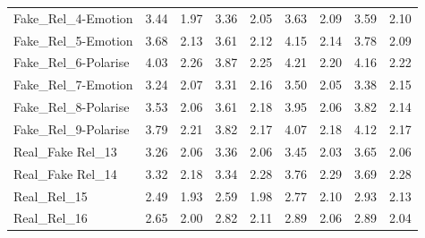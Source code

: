 \documentclass[empirical, authordate, issue]{jote-new-article}
\begin{document}
\begin{table}
\begin{tabularx}{\linewidth}{@{} X  S  S  S  S | S  S  S  S@{}}
    Fake\_Rel\_4-Emotion   & 3.44                                           & 1.97                                         & 3.36           & 2.05            & 3.63          & 2.09           & 3.59           & 2.10            \\
    Fake\_Rel\_5-Emotion   & 3.68                                           & 2.13                                         & 3.61           & 2.12            & 4.15          & 2.14           & 3.78           & 2.09            \\
    Fake\_Rel\_6-Polarise  & 4.03                                           & 2.26                                         & 3.87           & 2.25            & 4.21          & 2.20           & 4.16           & 2.22            \\
    Fake\_Rel\_7-Emotion   & 3.24                                           & 2.07                                         & 3.31           & 2.16            & 3.50          & 2.05           & 3.38           & 2.15            \\
    Fake\_Rel\_8-Polarise  & 3.53                                           & 2.06                                         & 3.61           & 2.18            & 3.95          & 2.06           & 3.82           & 2.14            \\
    Fake\_Rel\_9-Polarise  & 3.79                                           & 2.21                                         & 3.82           & 2.17            & 4.07          & 2.18           & 4.12           & 2.17            \\
    Real\_Fake Rel\_13     & 3.26                                           & 2.06                                         & 3.36           & 2.06            & 3.45          & 2.03           & 3.65           & 2.06            \\
    Real\_Fake Rel\_14     & 3.32                                           & 2.18                                         & 3.34           & 2.28            & 3.76          & 2.29           & 3.69           & 2.28            \\
    Real\_Rel\_15          & 2.49                                           & 1.93                                         & 2.59           & 1.98            & 2.77          & 2.10           & 2.93           & 2.13            \\
    Real\_Rel\_16          & 2.65                                           & 2.00                                         & 2.82           & 2.11            & 2.89          & 2.06           & 2.89           & 2.04            \\
    \bottomrule
  \end{tabularx}


\end{table}
\end{document}
